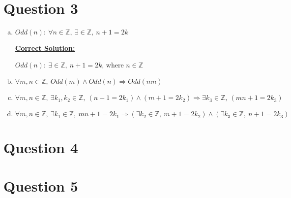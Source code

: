 \documentclass[12pt]{article}
\begin{document}
\section*{Question 3}
\begin{enumerate}[a.]
    \item $Odd(n):\:\forall n \in \mathbb{Z},\:\exists \in \mathbb{Z},\:n+1=2k$

    \bigskip

    \begin{mdframed}
        \underline{\textbf{Correct Solution:}}

        \bigskip

        $Odd(n):\:\exists \in \mathbb{Z},\:n+1=2k$, \color{red}where $n \in \mathbb{Z}$\color{black}
    \end{mdframed}

    \item $\forall m,n \in \mathbb{Z},\:Odd(m) \land Odd(n) \Rightarrow Odd(mn)$
    \item $\forall m,n \in \mathbb{Z},\:\exists k_1,k_2 \in \mathbb{Z},\:(n+1=2k_1)
    \land (m+1=2k_2) \Rightarrow \exists k_3 \in \mathbb{Z},\:(mn+1=2k_3)$
    \item $\forall m,n \in \mathbb{Z},\:\exists k_1 \in \mathbb{Z},\: mn + 1 = 2k_1
    \Rightarrow (\exists k_2 \in \mathbb{Z},\:m+1 = 2k_2) \land (\exists k_3 \in \mathbb{Z},\:
    n + 1 = 2k_3)$
\end{enumerate}

\section*{Question 4}

\section*{Question 5}
\end{document}

